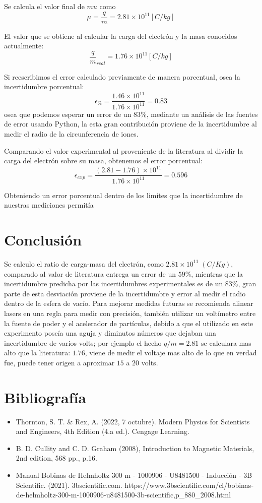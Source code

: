 \documentclass[a4paper,twocolumn,10pt]{article}
\begin{document}
Se calcula el valor final de $mu$ como
$$
\mu = \frac{q}{m} = 2.81 \times 10^{11} [C/kg]
$$

El valor que se obtiene al calcular la carga del electrón y la masa conocidos actualmente:
$$
\frac{q}{m}_{real} = 1.76 \times 10^{11} [C/kg]
$$

Si reescribimos el error calculado previamente de manera porcentual, osea la incertidumbre porcentual:
$$
\epsilon_{\%} = \frac{ 1.46 \times 10^{11}}{1.76 \times 10^{11}} = 0.83
$$
osea que podemos esperar un error de un $83\%$, mediante un análisis de las fuentes de error usando Python, la esta gran contribución proviene de la incertidumbre al medir el radio de la circunferencia de iones.

Comparando el valor experimental al proveniente de la literatura al dividir la carga del electrón sobre su masa, obtenemos el error porcentual:
$$
\epsilon_{exp} = \frac{(2.81 -1.76)\times 10^{11} }{1.76 \times 10^{11}} = 0.596
$$

Obteniendo un error porcentual dentro de los limites que la incertidumbre de nuestras mediciones permitía

\section{Conclusión}
Se calculo el ratio de carga-masa del electrón, como $2.81 \times 10^{11} \; (C/Kg)$, comparado al valor de literatura entrega un error de un $59\%$, mientras que la incertidumbre predicha por las incertidumbres experimentales es de un $83\%$, gran parte de esta desviación proviene de la incertidumbre y error al medir el radio dentro de la esfera de vacío. Para mejorar medidas futuras se recomienda alinear lasers en una regla para medir con precisión, también utilizar un voltímetro entre la fuente de poder y el acelerador de partículas, debido a que el utilizado en este experimento poseía una aguja y diminutos números que dejaban una incertidumbre de varios volts; por ejemplo el hecho $q/m = 2.81$ se calculara mas alto que la literatura: $1.76$, viene de medir el voltaje mas alto de lo que en verdad fue, puede tener origen a aproximar $15$ a $20$ volts.

\section{Bibliografía}
\begin{itemize}
\item Thornton, S. T. \& Rex, A. (2022, 7 octubre). Modern Physics for Scientists and Engineers, 4th Edition (4.a ed.). Cengage Learning.
\item B. D. Cullity and C. D. Graham (2008), Introduction to Magnetic Materials, 2nd edition, 568 pp., p.16.
\item Manual Bobinas de Helmholtz 300 m - 1000906 - U8481500 - Inducción - 3B Scientific. (2021). 3bscientific.com. https://www.3bscientific.com/cl/bobinas-de-helmholtz-300-m-1000906-u8481500-3b-scientific,p_880_2008.html

‌
\end{itemize}
\end{document}
